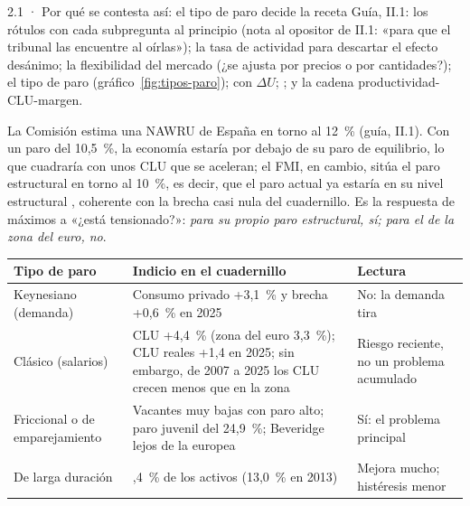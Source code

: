 \begin{complemento}{2.1 · Por qué se contesta así: el tipo de paro decide la receta}
 Guía, II.1: los rótulos con cada subpregunta al principio (nota al opositor de II.1: «para que el tribunal las encuentre al oírlas»); la tasa de actividad para descartar el efecto desánimo; la flexibilidad del mercado (¿se ajusta por precios o por cantidades?); el tipo de paro (gráfico~\ref{fig:tipos-paro});  con $\Delta U$; ; y la cadena productividad-CLU-margen.

 La Comisión estima una NAWRU de España en torno al 12~\% \parencite{CE2026AMECO} (guía, II.1). Con un paro del 10,5~\%, la economía estaría por debajo de su paro de equilibrio, lo que cuadraría con unos CLU que se aceleran; el FMI, en cambio, sitúa el paro estructural en torno al 10~\%, es decir, que el paro actual ya estaría en su nivel estructural , coherente con la brecha casi nula del cuadernillo. Es la respuesta de máximos a «¿está tensionado?»: \emph{para su propio paro estructural, sí; para el de la zona del euro, no}.

\begin{figuracaja}
\caption{Tipos de paro: cómo se detectan y qué receta tienen (infografía de la guía)}\label{fig:tipos-paro}
\end{figuracaja}

\begin{tablacaja}
\centering\scriptsize
\caption{¿Qué paro tiene España? Los indicios del cuadernillo}\label{tab:tipo-paro}
\begin{tabular}{>{\raggedright\arraybackslash}p{2.6cm}>{\raggedright\arraybackslash}p{6.2cm}>{\raggedright\arraybackslash}p{5.2cm}}
\toprule
\rowcolor{tceeazulpalido}
\textbf{Tipo de paro} & \textbf{Indicio en el cuadernillo} & \textbf{Lectura} \\
\midrule
Keynesiano (demanda) & Consumo privado +3,1~\% y brecha +0,6~\% en 2025 & \textcolor{tceeverde}{No}: la demanda tira \\
Clásico (salarios) & CLU +4,4~\% (zona del euro 3,3~\%); CLU reales +1,4 en 2025; sin embargo, de 2007 a 2025 los CLU crecen menos que en la zona & \textcolor{tceedorado}{Riesgo reciente}, no un problema acumulado \\
Friccional o de emparejamiento & Vacantes muy bajas con paro alto; paro juvenil del 24,9~\%; Beveridge lejos de la europea & \textcolor{tceerojo}{Sí}: el problema principal \\
De larga duración & 3,4~\% de los activos (13,0~\% en 2013) & \textcolor{tceeverde}{Mejora mucho}; histéresis menor \\
\bottomrule
\end{tabular}
\end{tablacaja}

\end{complemento}

